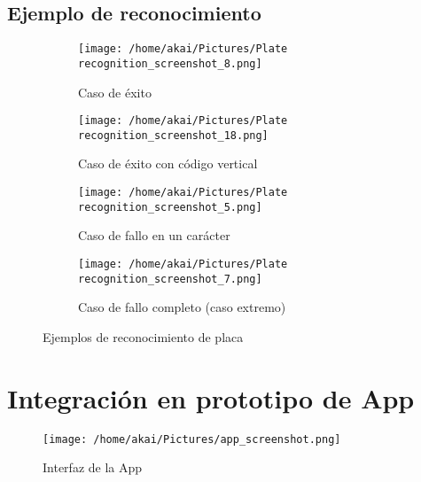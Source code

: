 \documentclass[12pt,a4paper]{article}
\begin{document}
\subsection{Ejemplo de reconocimiento}

\begin{figure}[H]
	\centering
	\begin{subfigure}[b]{0.45\textwidth}
		\centering
		\texttt{[image: /home/akai/Pictures/Plate recognition\_screenshot\_8.png]}
		\caption{Caso de éxito}
	\end{subfigure}
	\hfill
	\begin{subfigure}[b]{0.45\textwidth}
		\centering
		\texttt{[image: /home/akai/Pictures/Plate recognition\_screenshot\_18.png]}
		\caption{Caso de éxito con código vertical}
	\end{subfigure}

	\begin{subfigure}[b]{0.45\textwidth}
		\centering
		\texttt{[image: /home/akai/Pictures/Plate recognition\_screenshot\_5.png]}
		\caption{Caso de fallo en un carácter}
	\end{subfigure}
	\hfill
	\begin{subfigure}[b]{0.45\textwidth}
		\centering
		\texttt{[image: /home/akai/Pictures/Plate recognition\_screenshot\_7.png]}
		\caption{Caso de fallo completo (caso extremo)}
	\end{subfigure}

	\caption{Ejemplos de reconocimiento de placa}
	\label{fig:eje_ocr}
\end{figure}

\section{Integración en prototipo de App}

\begin{figure}[H]
	\centering
	\texttt{[image: /home/akai/Pictures/app\_screenshot.png]}
	\caption{Interfaz de la App}
	\label{fig:app_interface}
\end{figure}
\end{document}
